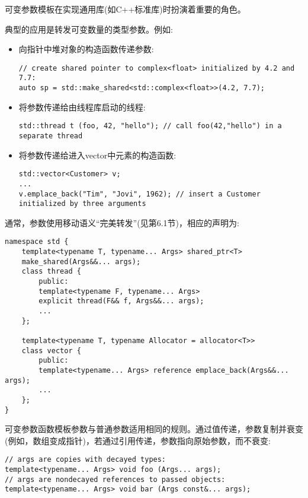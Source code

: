 可变参数模板在实现通用库(如C++标准库)时扮演着重要的角色。

典型的应用是转发可变数量的类型参数。例如:

\begin{itemize}
\item 
向指针中堆对象的构造函数传递参数:
\begin{lstlisting}[style=styleCXX]
// create shared pointer to complex<float> initialized by 4.2 and 7.7:
auto sp = std::make_shared<std::complex<float>>(4.2, 7.7);
\end{lstlisting}

\item 
将参数传递给由线程库启动的线程:
\begin{lstlisting}[style=styleCXX]
std::thread t (foo, 42, "hello"); // call foo(42,"hello") in a separate thread
\end{lstlisting}

\item 
将参数传递给进入vector中元素的构造函数:
\begin{lstlisting}[style=styleCXX]
std::vector<Customer> v;
...
v.emplace_back("Tim", "Jovi", 1962); // insert a Customer initialized by three arguments
\end{lstlisting}

\end{itemize}

通常，参数使用移动语义“完美转发”(见第6.1节)，相应的声明为:

\begin{lstlisting}[style=styleCXX]
namespace std {
	template<typename T, typename... Args> shared_ptr<T>
	make_shared(Args&&... args);
	class thread {
		public:
		template<typename F, typename... Args>
		explicit thread(F&& f, Args&&... args);
		...
	};

	template<typename T, typename Allocator = allocator<T>>
	class vector {
		public:
		template<typename... Args> reference emplace_back(Args&&... args);
		...
	};
}
\end{lstlisting}

可变参数函数模板参数与普通参数适用相同的规则。通过值传递，参数复制并衰变(例如，数组变成指针)，若通过引用传递，参数指向原始参数，而不衰变:

\begin{lstlisting}[style=styleCXX]
// args are copies with decayed types:
template<typename... Args> void foo (Args... args);
// args are nondecayed references to passed objects:
template<typename... Args> void bar (Args const&... args);
\end{lstlisting}


































